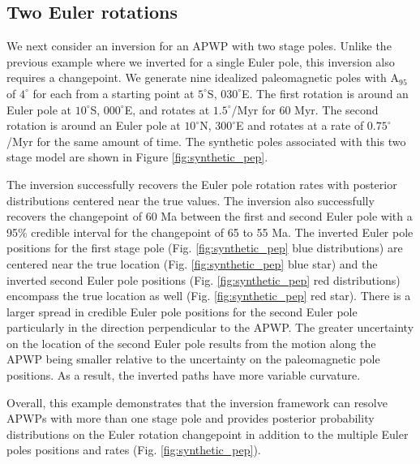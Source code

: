 \documentclass[11pt,letterpaper]{article}
\begin{document}
\subsection*{Two Euler rotations}
\label{sec:two_stage_poles}
We next consider an inversion for an APWP with two stage poles. Unlike the previous example where we inverted for a single Euler pole, this inversion also requires a changepoint. We generate nine idealized paleomagnetic poles with A$_{95}$ of $4^\circ$ for each from a starting point at $5^\circ$S, $030^\circ$E. The first rotation is around an Euler pole at $10^\circ$S, $000^\circ$E, and rotates at $1.5^\circ$/Myr for 60 Myr. The second rotation is around an Euler pole at $10^\circ$N, $300^\circ$E and rotates at a rate of $0.75^\circ$/Myr for the same amount of time. The synthetic poles associated with this two stage model are shown in Figure \ref{fig:synthetic_pep}. 

The inversion successfully recovers the Euler pole rotation rates with posterior distributions centered near the true values. The inversion also successfully recovers the changepoint of 60 Ma between the first and second Euler pole with a 95$\%$ credible interval for the changepoint of 65 to 55 Ma.  The inverted Euler pole positions for the first stage pole (Fig. \ref{fig:synthetic_pep} blue distributions) are centered near the true location (Fig. \ref{fig:synthetic_pep} blue star) and the inverted second Euler pole positions (Fig. \ref{fig:synthetic_pep} red distributions) encompass the true location as well (Fig. \ref{fig:synthetic_pep} red star). There is a larger spread in credible Euler pole positions for the second Euler pole particularly in the direction perpendicular to the APWP. The greater uncertainty on the location of the second Euler pole results from the motion along the APWP being smaller relative to the uncertainty on the paleomagnetic pole positions. As a result, the inverted paths have more variable curvature.  

Overall, this example demonstrates that the inversion framework can resolve APWPs with more than one stage pole and provides posterior probability distributions on the Euler rotation changepoint in addition to the multiple Euler poles positions and rates (Fig. \ref{fig:synthetic_pep}).
\end{document}
